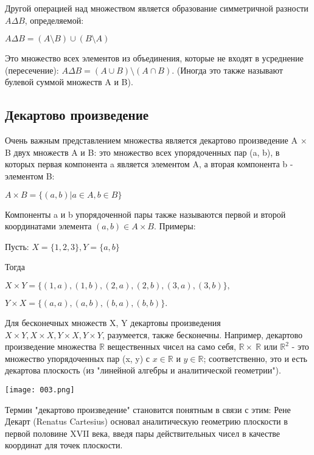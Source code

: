 Другой операцией над множеством является образование симметричной разности \(A \Delta B\), определяемой:

\vspace{0.5cm}
\(A \Delta B = (A \setminus B) \cup (B \setminus A)\)

\vspace{0.5cm}
Это множество всех элементов из объединения, которые не входят в усреднение (пересечение): \(A \Delta B = (A \cup B) \setminus (A \cap B)\). (Иногда это также называют булевой суммой множеств A и B).

\subsection{Декартово произведение}
Очень важным представлением множества является декартово произведение A × B двух множеств A и B: это множество всех упорядоченных пар (a, b), в которых первая компонента a является элементом A, а вторая компонента b - элементом B:

\vspace{0.5cm}
\(A \times B = \{(a,b) | a \in A, b \in B\}\)

\vspace{0.5cm}
Компоненты a и b упорядоченной пары также называются первой и второй координатами элемента \((a,b) \in A \times B\). Примеры:

Пусть: \(X=\{1,2,3\}, Y=\{a,b\}\)
\vspace{0.5cm}

Тогда

\(X \times Y=\{(1,a),(1,b),(2,a),(2,b),(3,a),(3,b)\},\)

\(Y \times X=\{(a,a),(a,b),(b,a),(b,b)\}.\)
\vspace{0.5cm}

Для бесконечных множеств X, Y декартовы произведения \(X \times Y, X \times X, Y \times X, Y \times Y\), разумеется, также бесконечны.
Например, декартово произведение множества \(\mathbb{R}\) вещественных чисел на само себя, \(\mathbb{R} \times \ \mathbb{R}\) или \(\mathbb{R}^2\) - это множество упорядоченных пар (x, y) с \(x \in \mathbb{R}\) и \(y \in \mathbb{R}\); соответственно, это и есть декартова плоскость (из "линейной алгебры и аналитической геометрии").
\begin{center}
  \texttt{[image: 003.png]}
\end{center}
Термин "декартово произведение" становится понятным в связи с этим: Рене Декарт (Renatus Cartesius) основал аналитическую геометрию плоскости в первой половине XVII века, введя пары действительных чисел в качестве координат для точек плоскости.

